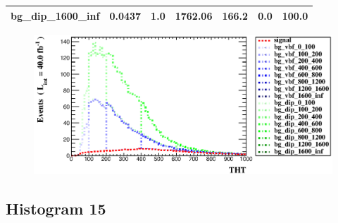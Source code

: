 \documentclass[a4paper, 10pt]{article}
\begin{document}
\begin{table}[H]
\begin{center}
\begin{tabular}{|m{23.0mm}|m{23.0mm}|m{18.0mm}|m{19.0mm}|m{19.0mm}|m{19.0mm}|m{19.0mm}|}
      \hline
      {\cellcolor{white}         bg\_dip\_1600\_inf}& {\cellcolor{white}         0.0437}& {\cellcolor{white}         1.0}& {\cellcolor{white}         1762.06}& {\cellcolor{white}         166.2}& {\cellcolor{red}         0.0}& {\cellcolor{red}         100.0}\\
\hline
    \end{tabular}
  \end{center}
\end{table}

\begin{figure}[H]
  \begin{center}
    \includegraphics[scale=0.45]{selection_13.eps}\\
\caption{   }
  \end{center}
\end{figure}
      \newpage
\subsection{ Histogram 15}
\end{document}
